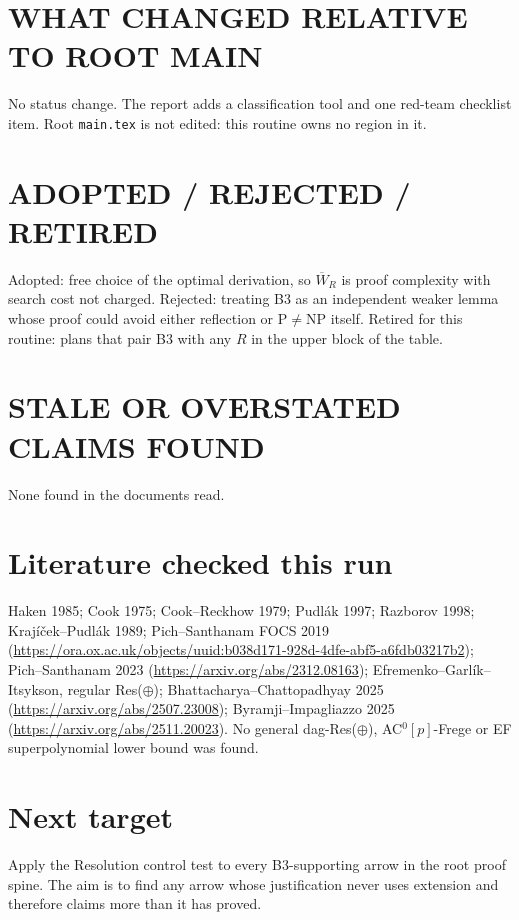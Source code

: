\documentclass[11pt]{article}
\newcommand{\Wb}{\overline W}
\begin{document}
\section*{WHAT CHANGED RELATIVE TO ROOT MAIN}
No status change. The report adds a classification tool and one red-team checklist item. Root
\texttt{main.tex} is not edited: this routine owns no region in it.

\section*{ADOPTED / REJECTED / RETIRED}
Adopted: free choice of the optimal derivation, so $\Wb_R$ is proof complexity with search cost not charged.
Rejected: treating B3 as an independent weaker lemma whose proof could avoid either reflection or
P$\neq$NP itself. Retired for this routine: plans that pair B3 with any $R$ in the upper block of the table.

\section*{STALE OR OVERSTATED CLAIMS FOUND}
None found in the documents read.

\section*{Literature checked this run}
Haken 1985; Cook 1975; Cook--Reckhow 1979; Pudl\'ak 1997; Razborov 1998; Krajíček--Pudl\'ak 1989;
Pich--Santhanam FOCS 2019 (\url{https://ora.ox.ac.uk/objects/uuid:b038d171-928d-4dfe-abf5-a6fdb03217b2});
Pich--Santhanam 2023 (\url{https://arxiv.org/abs/2312.08163}); Efremenko--Garl\'ik--Itsykson, regular Res($\oplus$);
Bhattacharya--Chattopadhyay 2025 (\url{https://arxiv.org/abs/2507.23008}); Byramji--Impagliazzo 2025
(\url{https://arxiv.org/abs/2511.20023}). No general dag-Res($\oplus$), AC$^0[p]$-Frege or EF superpolynomial lower bound was found.

\section*{Next target}
Apply the Resolution control test to every B3-supporting arrow in the root proof spine. The aim is to
find any arrow whose justification never uses extension and therefore claims more than it has proved.

\end{document}
